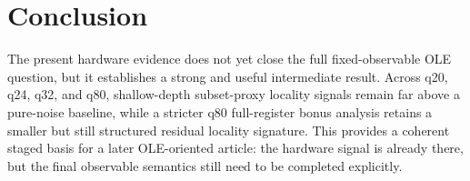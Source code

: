 \documentclass[11pt]{article}
\begin{document}
\section{Conclusion}

The present hardware evidence does not yet close the full fixed-observable OLE question, but it establishes a strong and useful intermediate result.
Across q20, q24, q32, and q80, shallow-depth subset-proxy locality signals remain far above a pure-noise baseline, while a stricter q80 full-register bonus analysis retains a smaller but still structured residual locality signature.
This provides a coherent staged basis for a later OLE-oriented article: the hardware signal is already there, but the final observable semantics still need to be completed explicitly.



\end{document}
